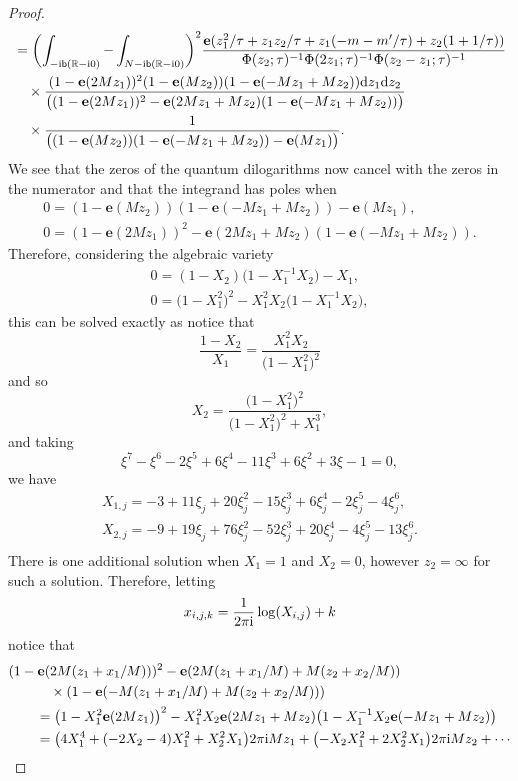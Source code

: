 \documentclass[pdftex]{sigma}
\numberwithin{equation}{section}
\def\BR{\mathbb{R}}
\def\e{\mathbf e}
\def\BR{\mathbb R}
\begin{document}
\begin{proof}
\begin{align}
 & =\biggl(\int_{-{\rm i}\mathsf{b}(\BR-{\rm i}0)}-\int_{N-{\rm i}\mathsf{b}(\BR-{\rm i}0)}\biggr)^2 \frac{\e(z_1^2/\tau+z_1z_2/\tau+z_1(-m-m'/\tau)+z_2(1+1/\tau))}{\Phi(z_2;\tau)^{-1}\Phi(2z_1;\tau)^{-1}\Phi(z_2-z_1;\tau)^{-1}}\nonumber\\
 & \quad \times \frac{(1-\e(2Mz_1))^2(1-\e(Mz_2))(1-\e(-Mz_1+Mz_2)){\rm d}z_1{\rm d} z_2}{\bigl((1-\e(2Mz_1))^2-\e(2Mz_{1}+Mz_{2})(1-\e(-Mz_1+Mz_2))\bigr) }\nonumber\\
 & \quad \times \frac{1}{\bigl((1-\e(Mz_2))(1-\e(-Mz_1+Mz_2))-\e(Mz_{1})\bigr)}  .\label{eq:integral.4112.atrat}
\end{align}
We see that the zeros of the quantum dilogarithms now cancel with the zeros in the numerator and that the integrand has poles when
\begin{gather*}
 0 =(1-\e(Mz_2))(1-\e(-Mz_1+Mz_2))-\e(Mz_{1}) ,\\
 0 =(1-\e(2Mz_1))^2-\e(2Mz_{1}+Mz_{2})(1-\e(-Mz_1+Mz_2)) .
\end{gather*}
Therefore, considering the algebraic variety
\begin{gather*}
 0 =(1-X_2)\bigl(1-X_1^{-1}X_2\bigr)-X_1 ,\\
 0 =\bigl(1-X_1^2\bigr)^2-X_1^2X_2\bigl(1-X_1^{-1}X_2\bigr) ,
\end{gather*}
this can be solved exactly as notice that
\[
 \frac{1-X_2}{X_{1}} =\frac{X_1^2X_2}{\bigl(1-X_1^2\bigr)^2}
\]
and so
\[
 X_{2} =\frac{\bigl(1-X_1^2\bigr)^2}{\bigl(1-X_1^2\bigr)^2+X_{1}^3} ,
\]
and taking
\[
 \xi^7 - \xi^6 - 2 \xi^5 + 6 \xi^4 - 11 \xi^3 + 6 \xi^2 + 3 \xi - 1 =0 ,
\]
we have
\begin{gather*}
 X_{1,j} =-3+11\xi_j+20\xi_j^2-15\xi_j^3+6\xi_j^4-2\xi_j^5-4\xi_j^6 ,\\
 X_{2,j} =-9+19\xi_j+76\xi_j^2-52\xi_j^3+20\xi_j^4-4\xi_j^5-13\xi_j^6 .\\
\end{gather*}
There is one additional solution when $X_{1}=1$ and $X_{2}=0$, however $z_2=\infty$ for such a solution. Therefore, letting
\[
 x_{i,j,k} =\frac{1}{2\pi {\rm i}}\log(X_{i,j})+k
\]
notice that
\begin{align*}
 &(1-\e(2M(z_1+x_{1}/M)))^2-\e(2M(z_1+x_{1}/M)+M(z_2+x_2/M))\\
 &\qquad\quad\times(1-\e(-M(z_1+x_{1}/M)+M(z_2+x_2/M)))\\
 & \qquad =
 \bigl(1-X_{1}^2\e(2Mz_1)\bigr)^2-X_{1}^2X_{2}\e(2Mz_1+Mz_2)\bigl(1-X_{1}^{-1}X_{2}\e(-Mz_1+Mz_2)\bigr)\\
 & \qquad =
 \bigl(4X_1^4 + (-2X_2 - 4)X_1^2 + X_2^2X_1\bigr)2\pi {\rm i}Mz_1+\bigl(-X_2X_1^2 + 2X_2^2X_1\bigr)2\pi {\rm i}Mz_{2}+\cdots

\end{align*}
\end{proof}
\end{document}
